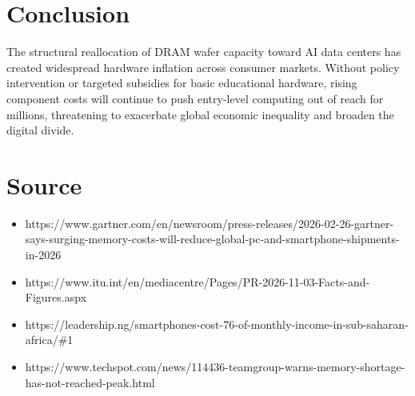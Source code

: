 \documentclass[11pt,a4paper]{article}
\begin{document}
\section{Conclusion}
The structural reallocation of DRAM wafer capacity toward AI data centers has
created widespread hardware inflation across consumer markets. Without policy
intervention or targeted subsidies for basic educational hardware, rising
component costs will continue to push entry-level computing out of reach for
millions, threatening to exacerbate global economic inequality and broaden the
digital divide.

\section{Source}
\begin{itemize}
\item https://www.gartner.com/en/newsroom/press-releases/2026-02-26-gartner-says-surging-memory-costs-will-reduce-global-pc-and-smartphone-shipments-in-2026
\item https://www.itu.int/en/mediacentre/Pages/PR-2026-11-03-Facts-and-Figures.aspx
\item https://leadership.ng/smartphones-cost-76-of-monthly-income-in-sub-saharan-africa/\#1
\item https://www.techspot.com/news/114436-teamgroup-warns-memory-shortage-has-not-reached-peak.html
\end{itemize}
\end{document}
